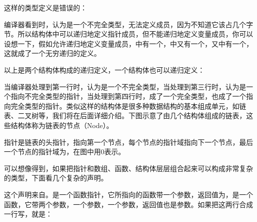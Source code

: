 这样的类型定义是错误的：




编译器看到时，认为是一个不完全类型，无法定义成员，因为不知道它该占几个字节。所以结构体中可以递归地定义指针成员，但不能递归地定义变量成员，你可以设想一下，假如允许递归地定义变量成员，中有一个，中又有一个，又中有一个，这就成了一个无穷递归的定义。



以上是两个结构体构成的递归定义，一个结构体也可以递归定义：




当编译器处理到第一行时，认为是一个不完全类型，当处理到第三行时，认为是一个指向不完全类型的指针，当处理到第四行\BookCode{\};\BookSplit{}}时，成了一个完全类型，也成了一个指向完全类型的指针。类似这样的结构体是很多种数据结构的基本组成单元，如链表、二叉树等，我们将在后面详细介绍。下图示意了由几个结构体组成的链表，这些结构体称为链表的节点（Node）。




指针是链表的头指针，指向第一个节点，每个节点的指针域指向下一个节点，最后一个节点的指针域为，在图中用0表示。



可以想像得到，如果把指针和数组、函数、结构体层层组合起来可以构成非常复杂的类型，下面看几个复杂的声明。




这个声明来自。是一个函数指针，它所指向的函数带一个参数，返回值为，是一个函数，它带两个参数，一个参数，一个参数，返回值也是参数。如果把这两行合成一行写，就是：




